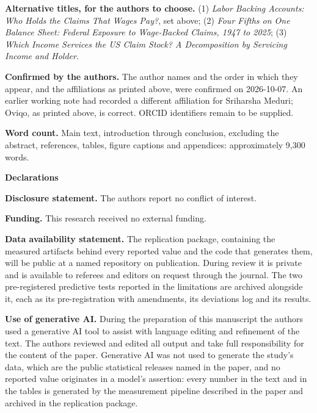 \documentclass[11pt]{article}
\begin{document}
\noindent\textbf{Alternative titles, for the authors to choose.} (1) \textit{Labor Backing
Accounts: Who Holds the Claims That Wages Pay?}, set above; (2) \textit{Four Fifths on One
Balance Sheet: Federal Exposure to Wage-Backed Claims, 1947 to 2025}; (3) \textit{Which Income
Services the US Claim Stock? A Decomposition by Servicing Income and Holder}.

\vspace{0.5em}

\noindent\textbf{Confirmed by the authors.} The author names and the order in which they appear,
and the affiliations as printed above, were confirmed on 2026-10-07. An earlier working note had
recorded a different affiliation for Sriharsha Meduri; Oviqo, as printed above, is correct.
ORCID identifiers remain to be supplied.

\vspace{1.5em}

\noindent\textbf{Word count.} Main text, introduction through conclusion, excluding the abstract,
references, tables, figure captions and appendices: approximately 9,300 words.

\vspace{1.5em}

\noindent\textbf{Declarations}

\vspace{0.5em}

\noindent\textbf{Disclosure statement.} The authors report no conflict of interest.

\vspace{0.5em}

\noindent\textbf{Funding.} This research received no external funding.

\vspace{0.5em}

\noindent\textbf{Data availability statement.} The replication package, containing the measured
artifacts behind every reported value and the code that generates them, will be public at a named
repository on publication. During review it is private and is available to referees and editors
on request through the journal. The two pre-registered predictive tests reported in the
limitations are archived alongside it, each as its pre-registration with amendments, its
deviations log and its results.

\vspace{0.5em}

\noindent\textbf{Use of generative AI.} During the preparation of this manuscript the authors
used a generative AI tool to assist with language editing and refinement of the text. The authors
reviewed and edited all output and take full responsibility for the content of the paper.
Generative AI was not used to generate the study's data, which are the public statistical
releases named in the paper, and no reported value originates in a model's assertion: every
number in the text and in the tables is generated by the measurement pipeline described in the
paper and archived in the replication package.
\end{document}
